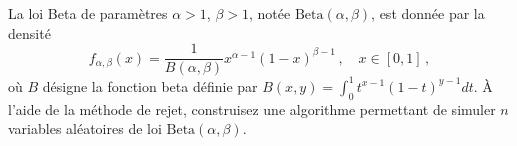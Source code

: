 \documentclass[11pt]{td_um}
\newcommand{\vas}{variables aléatoires\xspace}
\begin{document}
\begin{exo}{}
	La loi Beta de paramètres $\alpha > 1$, $\beta > 1$, notée $\text{Beta}(\alpha, \beta)$, est donnée par la densité
	\[
	f_{\alpha, \beta}(x)
	= \dfrac{1}{B(\alpha,\beta)} x^{\alpha-1} (1-x)^{\beta-1}\,,
	\quad x \in [0,1]\,,
	\]
	où $B$ désigne la fonction beta définie par $
	B (x,y) = \int_0^1 t^{x-1} (1-t)^{y-1} dt$.
	À l'aide de la méthode de rejet, construisez une algorithme permettant de simuler $n$ \vas de loi $\text{Beta}(\alpha,\beta)$.





\end{exo}
\end{document}
